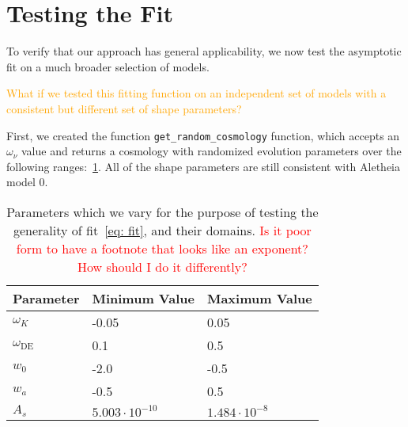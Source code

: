 \section{Testing the Fit}

To verify that our approach has general applicability, we now test the
asymptotic fit on a much broader selection of models.

\textcolor{orange}{What if we tested this fitting function on an independent
set of models with a consistent but different set of shape parameters?}

First, we created the function \verb|get_random_cosmology| function, which
accepts an $\omega_\nu$ value and returns a cosmology with randomized
evolution parameters over the following ranges:~\ref{tab: fit_test_params}.
All of the shape parameters are still consistent with Aletheia model 0.

\begin{table}[ht!]
\centering
\begin{tabular}{l|l|l}
\hline
Parameter & Minimum Value & Maximum Value \\ \hline
$\omega_K$ & -0.05 & 0.05 \\
$\omega_\text{DE}$\footnotemark & 0.1 & 0.5 \\
$w_0$ & -2.0 & -0.5 \\
$w_a$ & -0.5 & 0.5 \\
$A_s$\footnotemark & $5.003 \cdot 10^{-10}$ & $1.484 \cdot 10^{-8}$  \\
\end{tabular}
 \cprotect\caption[Parameter Ranges for Random Test
 	Cosmologies]{Parameters which we vary for the purpose of testing the
 	generality of fit~\ref{eq: fit}, and their domains.
 	\textcolor{red}{Is it poor form to have a footnote that looks like an
 	exponent? How should I do it differently?}}
 \label{tab: fit_test_params}
\end{table}

\addtocounter{footnote}{-1}


